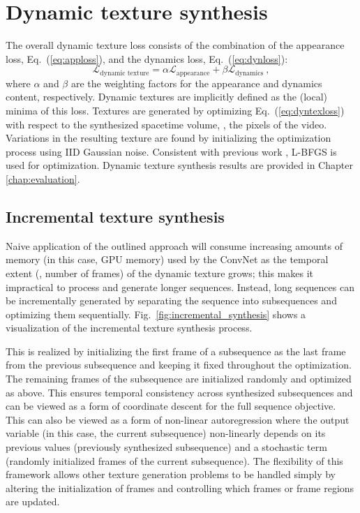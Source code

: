 \section{Dynamic texture synthesis}\label{sec:texgen}
The overall dynamic texture loss consists of the combination of the appearance loss, Eq.\ (\ref{eq:apploss}),
and the dynamics loss, Eq.\ (\ref{eq:dynloss}):
\begin{equation}
   \mathcal{L}_\text{dynamic texture} = \alpha\mathcal{L}_\text{appearance} + \beta \mathcal{L}_\text{dynamics}\ , \label{eq:dyntexloss}
\end{equation}
where $\alpha$ and $\beta$ are the weighting factors for the
appearance and dynamics content, respectively.
Dynamic textures are implicitly defined as the (local) minima 
of this loss.
Textures are generated by optimizing Eq.\ 
(\ref{eq:dyntexloss}) with respect to the synthesized spacetime volume,
\ie, the pixels of the video.
Variations in the resulting texture are found by initializing the
optimization process using IID Gaussian noise.
Consistent with previous work \cite{gatys2015}, L-BFGS \cite{liu1989} is used for optimization. Dynamic texture synthesis results are provided in Chapter \ref{chap:evaluation}.

\subsection{Incremental texture synthesis}\label{sec:incremental_synthesis}

Naive application of the outlined approach will consume
increasing amounts of memory (in this case, GPU memory) used by the ConvNet as the temporal extent (\ie, number of frames) of the 
dynamic texture grows; this makes it impractical to process and generate longer sequences.
Instead, long sequences can be incrementally generated by
separating the sequence into subsequences and optimizing them 
sequentially. Fig.\ \ref{fig:incremental_synthesis}
shows a visualization of the incremental texture synthesis process.

This is realized by initializing the first frame of a subsequence as the last 
frame from the previous subsequence and keeping it fixed throughout
the optimization.
The remaining frames of the subsequence are initialized randomly and
optimized as above.
This ensures temporal consistency across synthesized subsequences
and can be viewed as a form of coordinate descent for the full
sequence objective. This can also be viewed as a form of non-linear autoregression where the output variable (in this case, the current subsequence) non-linearly depends on its previous values (previously synthesized subsequence) and a stochastic term (randomly initialized frames of the current subsequence).
The flexibility of this framework allows other texture generation
problems to be handled simply by altering the 
initialization of frames and controlling which
frames or frame regions are updated.

